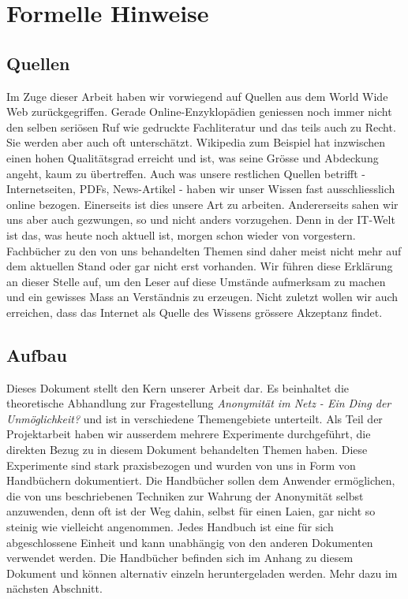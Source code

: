 \section{Formelle Hinweise}

\subsection{Quellen}
Im Zuge dieser Arbeit haben wir vorwiegend auf Quellen aus dem World Wide Web zurückgegriffen. Gerade Online-Enzyklopädien geniessen noch immer nicht den selben seriösen Ruf wie gedruckte Fachliteratur und das teils auch zu Recht. Sie werden aber auch oft unterschätzt. Wikipedia zum Beispiel hat inzwischen einen hohen Qualitätsgrad erreicht und ist, was seine Grösse und Abdeckung angeht, kaum zu übertreffen. Auch was unsere restlichen Quellen betrifft - Internetseiten, PDFs, News-Artikel - haben wir unser Wissen fast ausschliesslich online bezogen. Einerseits ist dies unsere Art zu arbeiten. Andererseits sahen wir uns aber auch gezwungen, so und nicht anders vorzugehen. Denn in der IT-Welt ist das, was heute noch aktuell ist, morgen schon wieder von vorgestern. Fachbücher zu den von uns behandelten Themen sind daher meist nicht mehr auf dem aktuellen Stand oder gar nicht erst vorhanden. Wir führen diese Erklärung an dieser Stelle auf, um den Leser auf diese Umstände aufmerksam zu machen und ein gewisses Mass an Verständnis zu erzeugen. Nicht zuletzt wollen wir auch erreichen, dass das Internet als Quelle des Wissens grössere Akzeptanz findet.

\subsection{Aufbau}
Dieses Dokument stellt den Kern unserer Arbeit dar. Es beinhaltet die theoretische Abhandlung zur Fragestellung \textit{Anonymität im Netz - Ein Ding der Unmöglichkeit?} und ist in verschiedene Themengebiete unterteilt. Als Teil der Projektarbeit haben wir ausserdem mehrere Experimente durchgeführt, die direkten Bezug zu in diesem Dokument behandelten Themen haben. Diese Experimente sind stark praxisbezogen und  wurden von uns in Form von Handbüchern dokumentiert. Die Handbücher sollen dem Anwender ermöglichen, die von uns beschriebenen Techniken zur Wahrung der Anonymität selbst anzuwenden, denn oft ist der Weg dahin, selbst für einen Laien, gar nicht so steinig wie vielleicht angenommen. Jedes Handbuch ist eine für sich abgeschlossene Einheit und kann unabhängig von den anderen Dokumenten verwendet werden. Die Handbücher befinden sich im Anhang zu diesem Dokument und können alternativ einzeln heruntergeladen werden. Mehr dazu im nächsten Abschnitt.

